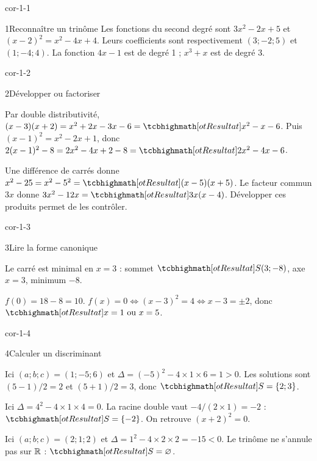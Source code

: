 \corrigesSouples

\begin{blocLivre}{cor-1-1}
\begin{corrige}{1}{Reconnaître un trinôme}
Les fonctions du second degré sont $3x^2-2x+5$ et $(x-2)^2=x^2-4x+4$.
Leurs coefficients sont respectivement $(3;-2;5)$ et $(1;-4;4)$.
La fonction $4x-1$ est de degré 1 ; $x^3+x$ est de degré 3.
\end{corrige}
\end{blocLivre}
\begin{blocLivre}{cor-1-2}
\begin{corrige}{2}{Développer ou factoriser}
\begin{questions}
\item Par double distributivité, $(x-3)(x+2)=x^2+2x-3x-6=\res{x^2-x-6}$.
Puis $(x-1)^2=x^2-2x+1$, donc $2(x-1)^2-8=2x^2-4x+2-8=\res{2x^2-4x-6}$.
\item Une différence de carrés donne $x^2-25=x^2-5^2=\res{(x-5)(x+5)}$.
Le facteur commun $3x$ donne $3x^2-12x=\res{3x(x-4)}$. Développer ces produits permet de les contrôler.
\end{questions}

\end{corrige}
\end{blocLivre}
\begin{blocLivre}{cor-1-3}
\begin{corrige}{3}{Lire la forme canonique}
\begin{questions}
\item Le carré est minimal en $x=3$ : sommet $\res{S(3;-8)}$, axe $x=3$, minimum $-8$.
\item $f(0)=18-8=10$. $f(x)=0\iff(x-3)^2=4\iff x-3=\pm2$,
donc $\res{x=1\text{ ou }x=5}$.
\end{questions}
\end{corrige}
\end{blocLivre}
\begin{blocLivre}{cor-1-4}
\begin{corrige}{4}{Calculer un discriminant}
\begin{questions}
\item Ici $(a;b;c)=(1;-5;6)$ et $\Delta=(-5)^2-4\times1\times6=1>0$.
Les solutions sont $(5-1)/2=2$ et $(5+1)/2=3$, donc $\res{S=\{2;3\}}$.
\item Ici $\Delta=4^2-4\times1\times4=0$. La racine double vaut $-4/(2\times1)=-2$ : $\res{S=\{-2\}}$.
On retrouve $(x+2)^2=0$.
\item Ici $(a;b;c)=(2;1;2)$ et $\Delta=1^2-4\times2\times2=-15<0$.
Le trinôme ne s’annule pas sur $\mathbb{R}$ : $\res{S=\varnothing}$.
\end{questions}

\end{corrige}
\end{blocLivre}
